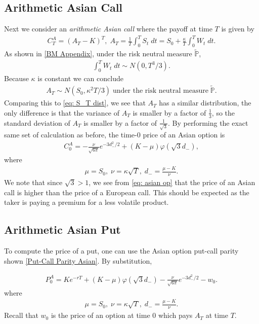\documentclass[reqno]{amsart}
\begin{document}
\subsection{Arithmetic Asian Call}
Next we consider an \emph{arithmetic Asian call} where the payoff at time $T$ is given by 
\begin{align} \label{eq: asian}
	 C^A_T = (A_T - K)^T, \; A_T = \frac{1}{T}\int_0^T S_t \; dt = S_0 + \frac{\kappa}{T} \int_0^T W_t \; dt. 
\end{align}
As shown in \eqref{BM Appendix}, under the risk neutral measure $\tilde{\mathbb{P}}$, 
\begin{align}
	 \int_0^T W_t \; dt \sim N(0, T^3/3).
\end{align}
Because $\kappa$ is constant we can conclude 
\begin{align}
	 A_T \sim N(S_0, \kappa^2 T/3) \; \text{under the risk neutral measure} \; \tilde{\mathbb{P}}.
\end{align}
Comparing this to \eqref{eq: S_T dist}, we see that $A_T$ has a similar distribution, the only difference is that the variance of $A_T$ is smaller by a factor of $\frac{1}{3}$,
so the standard deviation of $A_T$ is smaller by a factor of $\frac{1}{\sqrt{3}}$. By performing the exact same set of calculation as before, the time-0 price of an Asian option is 
\begin{align} \label{eq: asian op}
	 C^A_0 = -\frac{\nu}{\sqrt{6\pi}} e^{-3d_-^2/2} + (K-\mu) \varphi(\sqrt{3}d_-),
\end{align}
where 
\begin{align}
	 \mu = S_0, \; \nu = \kappa \sqrt{T}, \; d_- = \frac{\mu - K}{\nu}.
\end{align}
We note that since $\sqrt{3} > 1$, we see from \eqref{eq: asian op} that the price of an Asian call is higher than the price of a European call. This should be expected as the taker is paying a premium for a less volatile product. 


\subsection{Arithmetic Asian Put}
To compute the price of a put, one can use the Asian option put-call parity shown \eqref{Put-Call Parity Asian}. By substitution, 

\begin{align}
     P^A_0 = Ke^{-rT} + (K-\mu) \varphi(\sqrt{3}d_-) - \frac{\nu}{\sqrt{6\pi}} e^{-3d_-^2/2} - w_0.
\end{align}
where 
\begin{align}
	 \mu = S_0, \; \nu = \kappa \sqrt{T}, \; d_- = \frac{\mu - K}{\nu}.
\end{align}
Recall that $w_0$ is the price of an option at time 0 which pays $A_T$ at time $T$.
\end{document}
